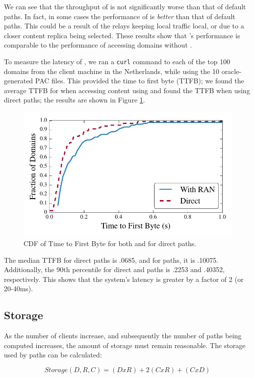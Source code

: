 We can see that the throughput of \system{} is not significantly worse than that 
of default paths.  In fact, in some cases the performance of \system{} is {\it 
better} than that of default paths.  This could be a result of the relays 
keeping local traffic local, or due to a closer content replica being selected. 
These results show that \system{}'s performance is comparable to the performance 
of accessing domains without \system{}.

To measure the latency of \system{}, we ran a {\tt curl} command to each of the 
top 100 domains from the client machine in the Netherlands, while using the 10
oracle-generated PAC files. This provided the time to first byte (TTFB); we 
found the average TTFB for when accessing content using \system{} and 
found the TTFB when using direct paths; the results are shown in Figure \ref{fig:latency}.  

\begin{figure}[t]
\centering
\includegraphics[width=.5\textwidth]{latency}
\caption{CDF of Time to First Byte for both \system{} and for direct paths.}
\label{fig:latency}
\end{figure}

The median TTFB for direct paths is .0685, and for \system{} paths, it is .10075.  Additionally, 
the 90th percentile for direct and \system{} paths is .2253 and .40352, respectively.  This 
shows that the system's latency is greater by a factor of 2 (or 20-40ms).  

\subsection{Storage}
As the number of clients increase, and subsequently the number of paths being 
computed increases, the amount of storage must remain reasonable.  The storage 
used by paths can be calculated:

\[Storage(D,R,C) = (D x R) + 2(C x R) + (C x D) \]

